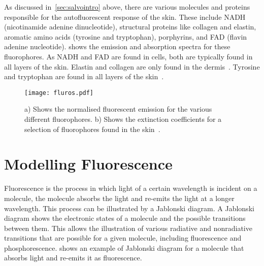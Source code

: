 As discussed in~\cref{sec:salvointro} above, there are various molecules and proteins responsible for the autofluorescent response of the skin.
These include NADH (nicotinamide adenine dinucleotide), structural proteins like collagen and elastin, aromatic amino acids (tyrosine and tryptophan), porphyrins, and FAD (flavin adenine nucleotide).
 shows the emission and absorption spectra for these fluorophores.
As NADH and FAD are found in cells, both are typically found in all layers of the skin.
Elastin and collagen are only found in the dermis~\cite{gillies2000fluorescence}.
Tyrosine and tryptophan are found in all layers of the skin~\cite{gillies2000fluorescence}.



\begin{figure}[!htbp]
  \centering
  \texttt{[image: fluros.pdf]}
  \caption{a) Shows the normalised fluorescent emission for the various different fluorophores. b) Shows the extinction coefficients for a selection of fluorophores found in the skin~\cite{prahltyro,prahltryto,soltani2019deep,sun2012biomarkers,islam2013ph,evans2013magnetic,von2012fluorescence,dacosta2003molecular}.}
  \label{fig:flurosshow}
\end{figure}
\FloatBarrier

\section{Modelling Fluorescence}

Fluorescence is the process in which light of a certain wavelength is incident on a molecule, the molecule absorbs the light and re-emits the light at a longer wavelength.
This process can be illustrated by a Jablonski diagram.
A Jablonski diagram shows the electronic states of a molecule and the possible transitions between them.
This allows the illustration of various radiative and nonradiative transitions that are possible for a given molecule, including fluorescence and phosphorescence.
 shows an example of Jablonski diagram for a molecule that absorbs light and re-emits it as fluorescence.

